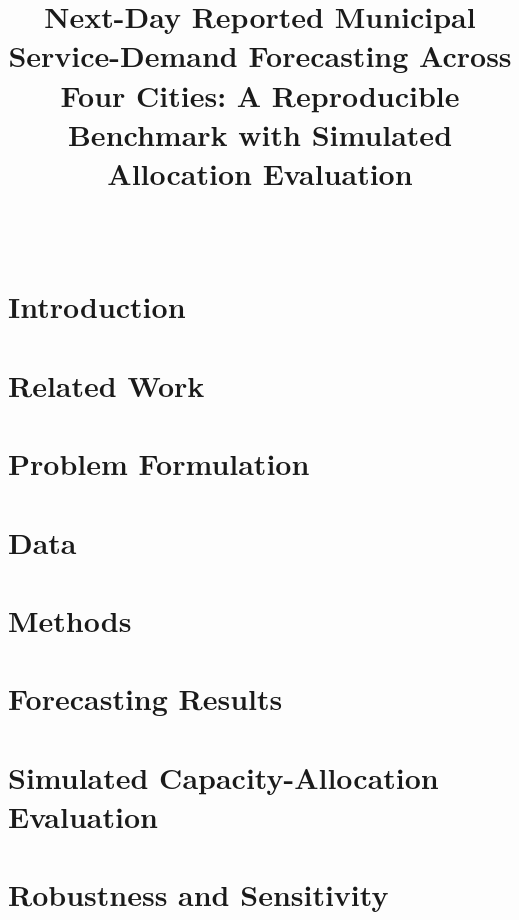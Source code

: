 \documentclass[conference]{IEEEtran}
\title{Next-Day Reported Municipal Service-Demand Forecasting Across Four
Cities: A Reproducible Benchmark with Simulated Allocation Evaluation}
\author{\IEEEauthorblockN{Nassar Naif Alsharif}\\
\IEEEauthorblockA{Independent Researcher \quad \texttt{NassarAlsharif0@gmail.com}}}
\begin{document}
\maketitle

\begin{abstract}

\end{abstract}

\section{Introduction}\label{sec:intro}


\section{Related Work}\label{sec:related}


\section{Problem Formulation}\label{sec:formulation}


\section{Data}\label{sec:data}


\section{Methods}\label{sec:methods}


\section{Forecasting Results}\label{sec:forecast}


\section{Simulated Capacity-Allocation Evaluation}\label{sec:decision}


\section{Robustness and Sensitivity}\label{sec:robust}

\end{document}
